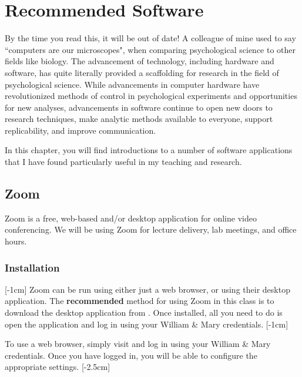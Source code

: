 
\chapter{Recommended Software}
By the time you read this, it will be out of date!  A colleague of mine used to say ``computers are our microscopes", when comparing psychological science to other fields like biology. The advancement of technology, including hardware and software, has quite literally provided a scaffolding for research in the field of psychological science.  While advancements in computer hardware have revolutionized methods of control in psychological experiments and opportunities for new analyses, advancements in software continue to open new doors to research techniques, make analytic methods available to everyone, support replicability, and improve communication.

In this chapter, you will find introductions to a number of software applications that I have found particularly useful in my teaching and research.
\newpage

\section{Zoom}
Zoom is a free, web-based and/or desktop application for online video conferencing.  We will be using Zoom for lecture delivery, lab meetings, and office hours.
\subsection{Installation}
\reversemarginpar
{}[-1cm]
Zoom can be run using either just a web browser, or using their desktop application. The \textbf{recommended} method for using Zoom in this class is to download the desktop application from .  Once installed, all you need to do is open the application and log in using your William \& Mary credentials.
\normalmarginpar\marginnote{\footnotesize{\textcolor{orange}{Note that there are Zoom apps for iOS, Chrome OS, and Android devices too!}}}[-1cm]

To use a web browser, simply visit  and log in using your William \& Mary credentials.  Once you have logged in, you will be able to configure the appropriate settings.
\reversemarginpar{}[-2.5cm]


